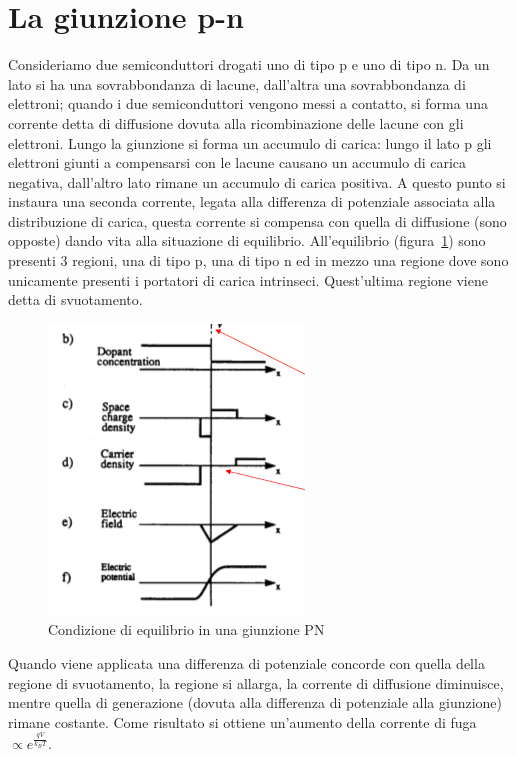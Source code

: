 \section{La giunzione p-n}
Consideriamo due semiconduttori drogati uno di tipo p e uno di tipo n.
Da un lato si ha una sovrabbondanza di lacune, dall'altra una sovrabbondanza di elettroni;
quando i due semiconduttori vengono messi a contatto, si forma una corrente detta di diffusione dovuta alla ricombinazione delle lacune con gli elettroni.
Lungo la giunzione si forma un accumulo di carica: lungo il lato p gli elettroni giunti a compensarsi con le lacune causano un accumulo di carica
negativa, dall'altro lato rimane un accumulo di carica positiva.
A questo punto si instaura una seconda corrente, legata alla differenza di potenziale associata alla distribuzione di carica, questa corrente
si compensa con quella di diffusione (sono opposte) dando vita alla situazione di equilibrio.
All'equilibrio (figura~\ref{fig:equilibrioPN}) sono presenti 3 regioni, una di tipo p, una di tipo n ed in mezzo una regione dove sono unicamente presenti i portatori di carica intrinseci.
Quest'ultima regione viene detta di svuotamento.
\begin{figure}[htbp]
\begin{center}
\includegraphics[scale=1]{./Immagini/EquilibrioPN.png}
\caption{Condizione di equilibrio in una giunzione PN}
\label{fig:equilibrioPN}
\end{center}
\end{figure}
Quando viene applicata una differenza di potenziale concorde con quella della regione di svuotamento, la regione si allarga, la corrente di diffusione
diminuisce, mentre quella di generazione (dovuta alla differenza di potenziale alla giunzione) rimane costante.
Come risultato si ottiene un'aumento della corrente di fuga $\propto e^{\frac{qV}{k_B T}}$.
